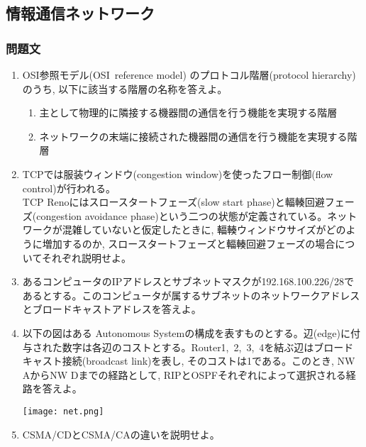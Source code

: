 \documentclass[dvipdfmx,titlepage, 11pt, a4paper]{jsarticle}%
\begin{document}
\subsection{情報通信ネットワーク}
\subsubsection{問題文}
\begin{enumerate}[(1)]
  \setlength{\itemsep}{15pt}
\item OSI参照モデル(OSI\ reference model) のプロトコル階層(protocol hierarchy)のうち, 以下に該当する階層の名称を答えよ。
  \begin{enumerate}[(${1}-$a)]
    \setlength{\itemsep}{5pt}
  \item 主として物理的に隣接する機器間の通信を行う機能を実現する階層
  \item  ネットワークの末端に接続された機器間の通信を行う機能を実現する階層
  \end{enumerate}
\item TCPでは服装ウィンドウ(congestion window)を使ったフロー制御(flow control)が行われる。\\
  TCP Renoにはスロースタートフェーズ(slow start phase)と輻輳回避フェーズ(congestion avoidance phase)という二つの状態が定義されている。ネットワークが混雑していないと仮定したときに, 輻輳ウィンドウサイズがどのように増加するのか, スロースタートフェーズと輻輳回避フェーズの場合についてそれぞれ説明せよ。
\item あるコンピュータのIPアドレスとサブネットマスクが192.168.100.226/28であるとする。このコンピュータが属するサブネットのネットワークアドレスとブロードキャストアドレスを答えよ。
\item 以下の図はある Autonomous Systemの構成を表すものとする。辺(edge)に付与された数字は各辺のコストとする。Router1,\ 2,\ 3,\ 4を結ぶ辺はブロードキャスト接続(broadcast link)を表し, そのコストは1である。このとき, NW AからNW Dまでの経路として, RIPとOSPFそれぞれによって選択される経路を答えよ。\\
  \begin{center}
    \texttt{[image: net.png]}
  \end{center}
\item CSMA/CDとCSMA/CAの違いを説明せよ。
\end{enumerate}
\newpage
\end{document}
